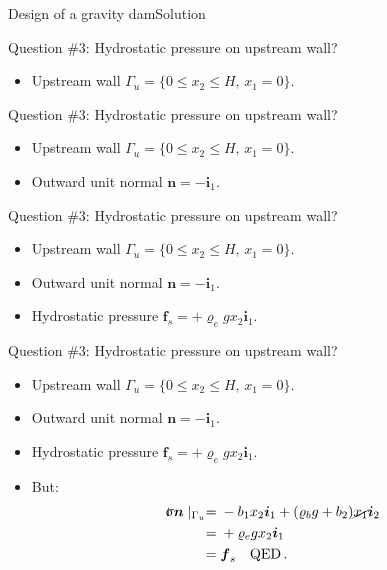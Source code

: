 \documentclass{beamer}
\newcommand{\xj}{x}
\renewcommand{\ij}{i}
\newcommand{\iv}{{\boldsymbol\ij}}
\newcommand{\fj}{f}
\newcommand{\nj}{n}
\newcommand{\fv}{{\boldsymbol\fj}}
\newcommand{\nv}{{\boldsymbol\nj}}
\newcommand{\roi}{\varrho}
\newcommand{\stress}{\mbox{$\hspace{0.3em}\rotatebox[x=0pt,y=0.2pt]{90}{\rule{0.017\linewidth}{0.4pt}}\hspace{-0.25em}\upsigma$}}
\begin{document}
\begin{frame}{Design of a gravity dam}{Solution}

\begin{overprint}

\vskip-20pt
\begin{exampleblock}{Question \#3: Hydrostatic pressure on upstream wall?}
\begin{itemize}
\item Upstream wall $\Gamma_u=\{0\leq\xj_2\leq H,\,\xj_1=0\}$.
\end{itemize}
\end{exampleblock}

\vskip-20pt
\begin{exampleblock}{Question \#3: Hydrostatic pressure on upstream wall?}
\begin{itemize}
\item Upstream wall $\Gamma_u=\{0\leq\xj_2\leq H,\,\xj_1=0\}$.
\item Outward unit normal $\nv=-\iv_1$.
\end{itemize}
\end{exampleblock}

\vskip-20pt
\begin{exampleblock}{Question \#3: Hydrostatic pressure on upstream wall?}
\begin{itemize}
\item Upstream wall $\Gamma_u=\{0\leq\xj_2\leq H,\,\xj_1=0\}$.
\item Outward unit normal $\nv=-\iv_1$.
\item Hydrostatic pressure $\fv_s=+\roi_e g\xj_2\iv_1$.
\end{itemize}
\end{exampleblock}

\vskip-20pt
\begin{exampleblock}{Question \#3: Hydrostatic pressure on upstream wall?}
\begin{itemize}
\item Upstream wall $\Gamma_u=\{0\leq\xj_2\leq H,\,\xj_1=0\}$.
\item Outward unit normal $\nv=-\iv_1$.
\item Hydrostatic pressure $\fv_s=+\roi_e g\xj_2\iv_1$.
\item But:
\begin{displaymath}
\begin{split}
\stress\nv\mid_{\Gamma_u} =&\;-b_1\xj_2\iv_1+(\roi_b g+b_2)\cancel{\xj_1}\iv_2 \\
=&\;+\roi_e g\xj_2\iv_1 \\
=&\;\fv_s\quad\text{QED}\,.
\end{split}
\end{displaymath}
\end{itemize}
\end{exampleblock}

\end{overprint}

\end{frame}
\end{document}
